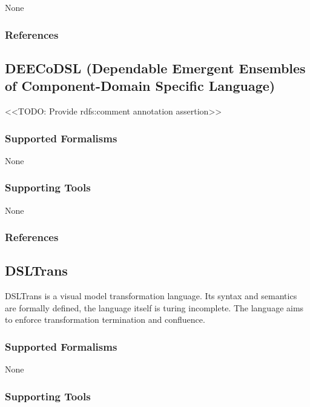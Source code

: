 None


\subsubsection{References}





\subsection{DEECoDSL (Dependable Emergent Ensembles of Component-Domain Specific Language)}
\label{subsecL:DEECoDSL}


<<TODO: Provide rdfs:comment annotation assertion>>

\subsubsection{Supported Formalisms}

None


\subsubsection{Supporting Tools}

None


\subsubsection{References}





\subsection{DSLTrans}
\label{subsecL:DSLTrans}
DSLTrans is a visual model transformation language. Its syntax and semantics are formally defined, the language itself is turing incomplete. The language aims to enforce transformation termination and confluence.

\subsubsection{Supported Formalisms}

None


\subsubsection{Supporting Tools}

